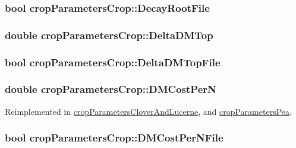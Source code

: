\label{classcrop_parameters_crop_a141269bfc3cdaf44fbc7b35115a8c49e}
\hypertarget{classcrop_parameters_crop_ac0c276992fb4eb39429772111deddc99}{
\subsubsection[{DecayRootFile}]{\setlength{\rightskip}{0pt plus 5cm}bool {\bf cropParametersCrop::DecayRootFile}}}
\label{classcrop_parameters_crop_ac0c276992fb4eb39429772111deddc99}
\hypertarget{classcrop_parameters_crop_a8de1318264dd7d9e6c57f3eca9c5a839}{
\subsubsection[{DeltaDMTop}]{\setlength{\rightskip}{0pt plus 5cm}double {\bf cropParametersCrop::DeltaDMTop}}}
\label{classcrop_parameters_crop_a8de1318264dd7d9e6c57f3eca9c5a839}
\hypertarget{classcrop_parameters_crop_ab1f3d6c752410829acef20a8295cebf1}{
\subsubsection[{DeltaDMTopFile}]{\setlength{\rightskip}{0pt plus 5cm}bool {\bf cropParametersCrop::DeltaDMTopFile}}}
\label{classcrop_parameters_crop_ab1f3d6c752410829acef20a8295cebf1}
\hypertarget{classcrop_parameters_crop_ac22d342576a5f3f5f769dd1dedaaa391}{
\subsubsection[{DMCostPerN}]{\setlength{\rightskip}{0pt plus 5cm}double {\bf cropParametersCrop::DMCostPerN}}}
\label{classcrop_parameters_crop_ac22d342576a5f3f5f769dd1dedaaa391}


Reimplemented in \hyperlink{classcrop_parameters_clover_and_lucerne_a773a03ccc9dd5d91252c10d77919daf8}{cropParametersCloverAndLucerne}, and \hyperlink{classcrop_parameters_pea_a672aa866e5e83329bf1d7043eeb959cd}{cropParametersPea}.\hypertarget{classcrop_parameters_crop_a453e9378c9d3abae8b3b23ac4416bf64}{
\subsubsection[{DMCostPerNFile}]{\setlength{\rightskip}{0pt plus 5cm}bool {\bf cropParametersCrop::DMCostPerNFile}}}
\label{classcrop_parameters_crop_a453e9378c9d3abae8b3b23ac4416bf64}


